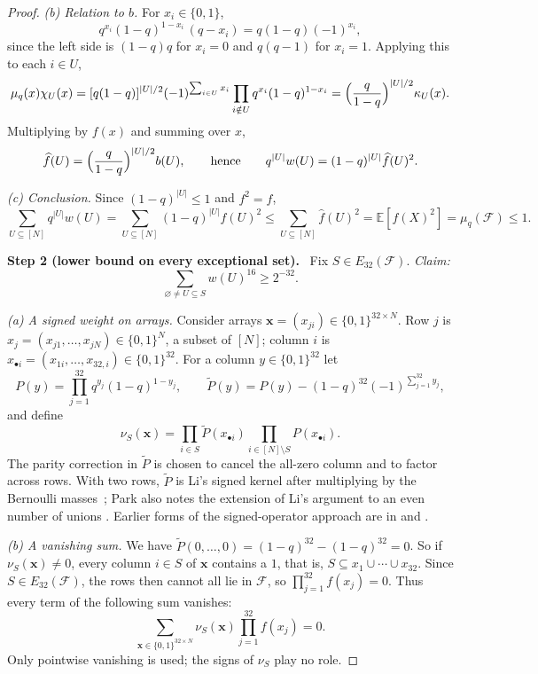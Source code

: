 \documentclass[11pt,letterpaper]{article}
\theoremstyle{definition}
\theoremstyle{remark}
\numberwithin{equation}{section}
\newcommand{\step}[1]{\medskip\noindent\textbf{#1.}\ }
\begin{document}
\begin{proof}
\emph{(b) Relation to $b$.} For $x_i\in\{0,1\}$,
\[
q^{x_i}(1-q)^{1-x_i}\,(q-x_i)=q(1-q)(-1)^{x_i},
\]
since the left side is $(1-q)q$ for $x_i=0$ and $q(q-1)$ for $x_i=1$. Applying
this to each $i\in U$,
\[
\mu_q(x)\chi_U(x)
=[q(1-q)]^{|U|/2}(-1)^{\sum_{i\in U}x_i}
\prod_{i\notin U}q^{x_i}(1-q)^{1-x_i}
=\Bigl(\frac{q}{1-q}\Bigr)^{|U|/2}\kappa_U(x).
\]
Multiplying by $f(x)$ and summing over $x$,
\[
\widehat f(U)=\Bigl(\frac{q}{1-q}\Bigr)^{|U|/2}b(U),
\qquad\text{hence}\qquad
q^{|U|}w(U)=(1-q)^{|U|}\widehat f(U)^2.
\]

\emph{(c) Conclusion.} Since $(1-q)^{|U|}\le1$ and $f^2=f$,
\[
 \sum_{U\subseteq[N]}q^{|U|}w(U)
 =\sum_{U\subseteq[N]}(1-q)^{|U|}\widehat f(U)^2
 \le\sum_{U\subseteq[N]}\widehat f(U)^2
 =\mathbb E[f(X)^2]
 =\mu_q(\mathcal F)\le1.
\]

\step{Step 2 (lower bound on every exceptional set)}
Fix $S\in E_{32}(\mathcal F)$. \emph{Claim:}
\begin{equation}\label{eq:exceptional}
 \sum_{\varnothing\ne U\subseteq S}w(U)^{16}\ge2^{-32}.
\end{equation}

\emph{(a) A signed weight on arrays.} Consider arrays
$\mathbf x=(x_{ji})\in\{0,1\}^{32\times N}$. Row $j$ is
$x_j=(x_{j1},\ldots,x_{jN})\in\{0,1\}^N$, a subset of $[N]$; column $i$ is
$x_{\bullet i}=(x_{1i},\ldots,x_{32,i})\in\{0,1\}^{32}$. For a column
$y\in\{0,1\}^{32}$ let
\[
 P(y)=\prod_{j=1}^{32}q^{y_j}(1-q)^{1-y_j},
 \qquad
 \widetilde P(y)=P(y)-(1-q)^{32}(-1)^{\sum_{j=1}^{32}y_j},
\]
and define
\[
\nu_S(\mathbf x)=\prod_{i\in S}\widetilde P(x_{\bullet i})
\prod_{i\in[N]\setminus S}P(x_{\bullet i}).
\]
The parity correction in $\widetilde P$ is chosen to cancel the all-zero
column and to factor across rows. With two rows, $\widetilde P$ is Li's signed
kernel after multiplying by the Bernoulli masses~\cite[Section~2]{Li26}; Park
also notes the extension of Li's argument to an even number of unions
\cite[Corollary~3.5, footnote~3]{Park26}. Earlier forms of the signed-operator
approach are in \cite[Section~2.2]{Friedgut08} and
\cite[Section~4.1]{EllisFilmusFriedgut12}.

\emph{(b) A vanishing sum.} We have
$\widetilde P(0,\ldots,0)=(1-q)^{32}-(1-q)^{32}=0$. So if
$\nu_S(\mathbf x)\ne0$, every column $i\in S$ of $\mathbf x$ contains a $1$,
that is, $S\subseteq x_1\cup\cdots\cup x_{32}$. Since
$S\in E_{32}(\mathcal F)$, the rows then cannot all lie in $\mathcal F$, so
$\prod_{j=1}^{32}f(x_j)=0$. Thus every term of the following sum vanishes:
\begin{equation}\label{eq:signed-zero}
 \sum_{\mathbf x\in\{0,1\}^{32\times N}}\nu_S(\mathbf x)
 \prod_{j=1}^{32}f(x_j)=0.
\end{equation}
Only pointwise vanishing is used; the signs of $\nu_S$ play no role.


\end{proof}
\end{document}
